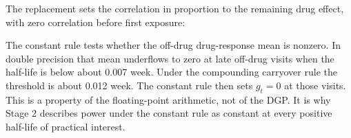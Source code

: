 \documentclass[
  11pt,
]{article}
\newenvironment{Shaded}{\begin{snugshade}}{\end{snugshade}}
\newcommand{\AttributeTok}[1]{\textcolor[rgb]{0.13,0.29,0.53}{#1}}
\newcommand{\CommentTok}[1]{\textcolor[rgb]{0.56,0.35,0.01}{\textit{#1}}}
\newcommand{\ControlFlowTok}[1]{\textcolor[rgb]{0.13,0.29,0.53}{\textbf{#1}}}
\newcommand{\DecValTok}[1]{\textcolor[rgb]{0.00,0.00,0.81}{#1}}
\newcommand{\FunctionTok}[1]{\textcolor[rgb]{0.13,0.29,0.53}{\textbf{#1}}}
\newcommand{\NormalTok}[1]{#1}
\newcommand{\OtherTok}[1]{\textcolor[rgb]{0.56,0.35,0.01}{#1}}
\newcommand{\SpecialCharTok}[1]{\textcolor[rgb]{0.81,0.36,0.00}{\textbf{#1}}}
\newcommand{\StringTok}[1]{\textcolor[rgb]{0.31,0.60,0.02}{#1}}
\begin{document}
The replacement sets the correlation in proportion to the remaining
drug effect, with zero correlation before first exposure:

\begin{Shaded}
\end{Shaded}

The constant rule tests whether the off-drug drug-response mean is
nonzero. In double precision that mean underflows to zero at late
off-drug visits when the half-life is below about 0.007 week. Under
the compounding carryover rule the threshold is about 0.012 week. The
constant rule then sets \(g_t = 0\) at those visits. This is a property of the
floating-point arithmetic, not of the DGP. It is why Stage 2 describes
power under the constant rule as constant at every positive half-life
of practical interest.
\end{document}
